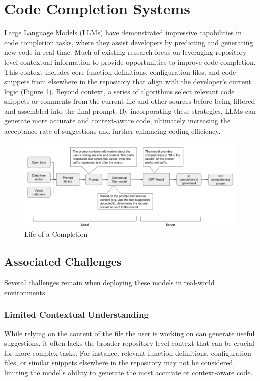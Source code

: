 \section{Code Completion Systems}

Large Language Models (LLMs) have demonstrated impressive capabilities in code completion tasks, where they assist developers by predicting and generating new code in real-time. Much of existing research focus on leveraging repository-level contextual information to provide opportunities to improve code completion. This context includes core function definitions, configuration files, and code snippets from elsewhere in the repository that align with the developer’s current logic (Figure \ref{fig:completion}). Beyond context, a series of algorithms select relevant code snippets or comments from the current file and other sources before being filtered and assembled into the final prompt. By incorporating these strategies, LLMs can generate more accurate and context-aware code, ultimately increasing the acceptance rate of suggestions and further enhancing coding efficiency. 

\begin{figure}
    \centering
    \includegraphics[width=0.8\linewidth]{fig/completion.png}
    \caption{Life of a Completion}
    \label{fig:completion}
\end{figure}

\subsection{Associated Challenges}

Several challenges remain when deploying these models in real-world environments.

\subsubsection{Limited Contextual Understanding}
While relying on the content of the file the user is working on can generate useful suggestions, it often lacks the broader repository-level context that can be crucial for more complex tasks. For instance, relevant function definitions, configuration files, or similar snippets elsewhere in the repository may not be considered, limiting the model’s ability to generate the most accurate or context-aware code.

